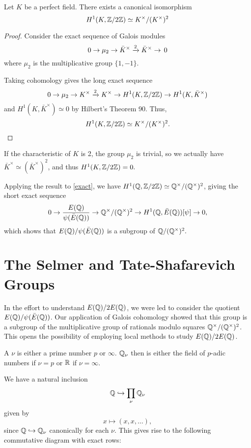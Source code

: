\documentclass[12pt, a4paper]{report}
\begin{document}
\begin{prop}
  Let $K$ be a perfect field. There exists a canonical isomorphism
  \[H^1(K, {\mathbb Z}/2{\mathbb Z}) \simeq K^{\times} / (K^{\times})^2\]
\end{prop}
\begin{proof}
Consider the exact sequence of Galois modules
\[0 \rightarrow \mu_2 \rightarrow \bar{K}^{\times} \xrightarrow[]{2} \bar{K}^{\times} \rightarrow
  \, 0 \]
where $\mu_2$ is the multiplicative group $\{1, -1\}.$
 
Taking cohomology gives the long exact sequence
\[ 0 \rightarrow \mu_2 \rightarrow K^{\times} \xrightarrow[]{2} K^{\times} \rightarrow H^1(K, {\mathbb Z}/2{\mathbb Z})
  \rightarrow H^1(K, \bar{K}^{\times})\]
and $H^1(K, \bar{K}^{\times}) \simeq 0$ by Hilbert's Theorem 90. Thus,
\[H^1(K, {\mathbb Z}/2{\mathbb Z}) \simeq K^{\times}/(K^{\times})^2. \qedhere\]
\end{proof}

\begin{remark}
  If the characteristic of $K$ is 2, the group $\mu_2$ is trivial, so we
  actually have $\bar{K}^\times \simeq (\bar{K}^\times)^2$, and thus $H^1(K,
  {\mathbb Z}/2{\mathbb Z}) = 0.$
\end{remark}

Applying the result to \autoref{exact}, we have $H^1({\mathbb Q}, {\mathbb Z} / 2{\mathbb Z}) \simeq
{\mathbb Q}^\times / ({\mathbb Q}^\times)^2$, giving the short exact sequence
\[0 \rightarrow \frac{E({\mathbb Q})}{\psi({\bar{E}({\mathbb Q})})} \rightarrow {\mathbb Q}^\times / ({\mathbb Q}^\times)^2 \rightarrow
H^1({\mathbb Q}, \bar{E}({\mathbb Q}))[\psi] \rightarrow 0,\]
which shows that $E({\mathbb Q}) / \psi(\bar{E}({\mathbb Q}))$ is a subgroup of ${\mathbb Q} / ({\mathbb Q}^\times)^2.$

\section{The Selmer and Tate-Shafarevich Groups}

In the effort to understand $E({\mathbb Q})/2E({\mathbb Q})$, we were led to consider the quotient
$E({\mathbb Q}) / \psi(\bar{E}({\mathbb Q}))$. Our application of Galois cohomology showed that this
group is a subgroup of the multiplicative group of rationals modulo squares
${\mathbb Q}^{\times} / ({\mathbb Q}^{\times})^2$. This opens the possibility of employing local
methods to study $E({\mathbb Q})/2E({\mathbb Q})$.

\begin{defn}
  A  $\nu$ is either a prime number $p$ or $\infty$. ${\mathbb Q}_\nu$ then is
  either the field of $p$-adic numbers if $\nu = p$ or ${\mathbb R}$ if $\nu = \infty$.
\end{defn}

We have a natural inclusion 
$${\mathbb Q} \hookrightarrow \prod\limits_\nu {\mathbb Q}_\nu$$
given by
$$x \mapsto (x, x, \dots),$$ 
since ${\mathbb Q} \hookrightarrow {\mathbb Q}_{\nu}$ canonically for each
$\nu$. This gives rise to the following commutative diagram with exact rows:
\end{document}

